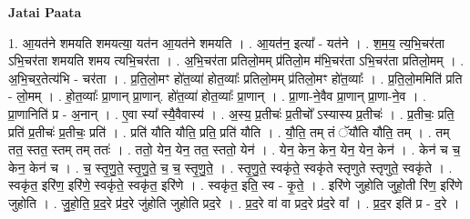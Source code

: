 \documentclass[17pt]{extarticle}
\begin{document}
\textbf{Jatai Paata} \newline

1. आ॒यत॑ने शमयति शमयत्या॒ यत॑न आ॒यत॑ने शमयति । . आ॒यत॑न॒ इत्या᳚ - यत॑ने । . श॒म॒य॒ त्य॒भि॒चर॑ता ऽभि॒चर॑ता शमयति शमय त्यभि॒चर॑ता । . अ॒भि॒चर॑ता प्रतिलो॒मम् प्र॑तिलो॒म म॑भि॒चर॑ता ऽभि॒चर॑ता प्रतिलो॒मम् । . अ॒भि॒चर॒तेत्य॑भि - चर॑ता । . प्र॒ति॒लो॒मꣳ हो॑त॒व्या॑ होत॒व्याः᳚ प्रतिलो॒मम् प्र॑तिलो॒मꣳ हो॑त॒व्याः᳚ । . प्र॒ति॒लो॒ममिति॑ प्रति - लो॒मम् । . हो॒त॒व्याः᳚ प्रा॒णान् प्रा॒णान्. हो॑त॒व्या॑ होत॒व्याः᳚ प्रा॒णान् । . प्रा॒णा-ने॒वैव प्रा॒णान् प्रा॒णा-ने॒व । . प्रा॒णानिति॑ प्र - अ॒नान् । . ए॒वा स्या᳚ स्यै॒वैवास्य॑ । . अ॒स्य॒ प्र॒तीचः॑ प्र॒तीचो᳚ ऽस्यास्य प्र॒तीचः॑ । . प्र॒तीचः॒ प्रति॒ प्रति॑ प्र॒तीचः॑ प्र॒तीचः॒ प्रति॑ । . प्रति॑ यौति यौति॒ प्रति॒ प्रति॑ यौति । . यौ॒ति॒ तम् तं ॅयौ॑ति यौति॒ तम् । . तम् तत॒ स्तत॒ स्तम् तम् ततः॑ । . ततो॒ येन॒ येन॒ तत॒ स्ततो॒ येन॑ । . येन॒ केन॒ केन॒ येन॒ येन॒ केन॑ । . केन॑ च च॒ केन॒ केन॑ च । . च॒ स्तृ॒णु॒ते॒ स्तृ॒णु॒ते॒ च॒ च॒ स्तृ॒णु॒ते॒ । . स्तृ॒णु॒ते॒ स्वकृ॑ते॒ स्वकृ॑ते स्तृणुते स्तृणुते॒ स्वकृ॑ते । . स्वकृ॑त॒ इरि॑ण॒ इरि॑णे॒ स्वकृ॑ते॒ स्वकृ॑त॒ इरि॑णे । . स्वकृ॑त॒ इति॒ स्व - कृ॒ते॒ । . इरि॑णे जुहोति जुहो॒ती रि॑ण॒ इरि॑णे जुहोति । . जु॒हो॒ति॒ प्र॒द॒रे प्र॑द॒रे जु॑होति जुहोति प्रद॒रे । . प्र॒द॒रे वा॑ वा प्रद॒रे प्र॑द॒रे वा᳚ । . प्र॒द॒र इति॑ प्र - द॒रे । \newline
\end{document}
